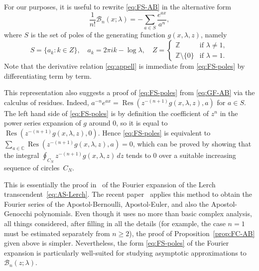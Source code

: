 \documentclass[11pt,a4paper]{amsart}
\newcommand{\Z}{\mathbb{Z}}
\newcommand{\C}{\mathbb{C}}
\newcommand{\B}{\mathcal{B}}
\newcommand{\res}{\operatorname{Res}}
\theoremstyle{plain}
\theoremstyle{remark}
\begin{document}
For our purposes, it is useful to rewrite \eqref{eq:FS-AB} in the alternative form
%
\begin{equation}
\label{eq:FS-poles}	
	\frac{1}{n!}\B_{n}(x;\lambda) = - \sum_{a \in S} \frac{e^{a x}}{a^{n}},
\end{equation}
%
where $S$ is the set of poles of the generating function $g(x,\lambda,z)$, namely
%
\begin{equation}
\label{def:poles}
	S = \{ a_{k} : k \in Z \},
	\quad
	a_{k} = 2 \pi i k - \log \lambda,
	\quad
	Z = \begin{cases}
	    \Z                 & \text{if $\lambda \neq 1$},
	       \\
	    \Z \setminus \{0\} & \text{if $\lambda = 1$.}
	    \end{cases}
\end{equation}
%
Note that the derivative relation \eqref{eq:appell} is immediate from \eqref{eq:FS-poles} by differentiating term by term.

This representation also suggests a proof of \eqref{eq:FS-poles} from \eqref{eq:GF-AB} via the calculus of residues. Indeed, $a^{-n} e^{ax} = \res(z^{-(n+1)} g(x,\lambda,z),a)$ for $a \in S$. The left hand side of \eqref{eq:FS-poles} is by definition the coefficient of $z^{n}$ in the power series expansion of $g$ around $0$, so it is equal to $\res(z^{-(n+1)} g(x,\lambda,z),0)$. Hence \eqref{eq:FS-poles} is equivalent to $\sum_{a \in \C} \res(z^{-(n+1)}g(x,\lambda,z),a) = 0$,
which can be proved by showing that the integral $\oint_{C_{N}} z^{-(n+1)}g(x,\lambda,z)\,dz$ tends to $0$ over a suitable increasing sequence of circles~$C_{N}$.

This is essentially the proof in~\cite[Section~1.11]{Bate} of the Fourier expansion of the Lerch transcendent~\eqref{eq:AS-Lerch}. The recent paper~\cite{Bayad} applies this method to obtain the Fourier series of the Apostol-Bernoulli, Apostol-Euler, and also the Apostol-Genocchi polynomials.
Even though it uses no more than basic complex analysis, all things considered, after filling in all the details (for example, the case $n=1$ must be estimated separately from $n \geq 2$), the proof of Proposition~\ref{prop:FC-AB} given above is simpler. Nevertheless, the form \eqref{eq:FS-poles} of the Fourier expansion is particularly well-suited for studying asymptotic approximations to $\B_{n}(z;\lambda)$. 
\end{document}
